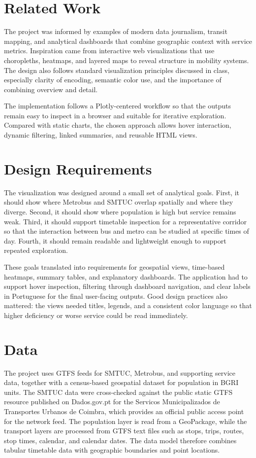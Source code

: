 \documentclass[11pt,a4paper]{article}
\begin{document}
\section{Related Work}
The project was informed by examples of modern data journalism, transit mapping, and analytical dashboards that combine geographic context with service metrics. Inspiration came from interactive web visualizations that use choropleths, heatmaps, and layered maps to reveal structure in mobility systems. The design also follows standard visualization principles discussed in class, especially clarity of encoding, semantic color use, and the importance of combining overview and detail.

The implementation follows a Plotly-centered workflow so that the outputs remain easy to inspect in a browser and suitable for iterative exploration. Compared with static charts, the chosen approach allows hover interaction, dynamic filtering, linked summaries, and reusable HTML views.

\section{Design Requirements}
The visualization was designed around a small set of analytical goals. First, it should show where Metrobus and SMTUC overlap spatially and where they diverge. Second, it should show where population is high but service remains weak. Third, it should support timetable inspection for a representative corridor so that the interaction between bus and metro can be studied at specific times of day. Fourth, it should remain readable and lightweight enough to support repeated exploration.

These goals translated into requirements for geospatial views, time-based heatmaps, summary tables, and explanatory dashboards. The application had to support hover inspection, filtering through dashboard navigation, and clear labels in Portuguese for the final user-facing outputs. Good design practices also mattered: the views needed titles, legends, and a consistent color language so that higher deficiency or worse service could be read immediately.

\section{Data}
The project uses GTFS feeds for SMTUC, Metrobus, and supporting service data, together with a census-based geospatial dataset for population in BGRI units. The SMTUC data were cross-checked against the public static GTFS resource published on Dados.gov.pt for the Servicos Municipalizados de Transportes Urbanos de Coimbra, which provides an official public access point for the network feed. The population layer is read from a GeoPackage, while the transport layers are processed from GTFS text files such as stops, trips, routes, stop times, calendar, and calendar dates. The data model therefore combines tabular timetable data with geographic boundaries and point locations.
\end{document}
